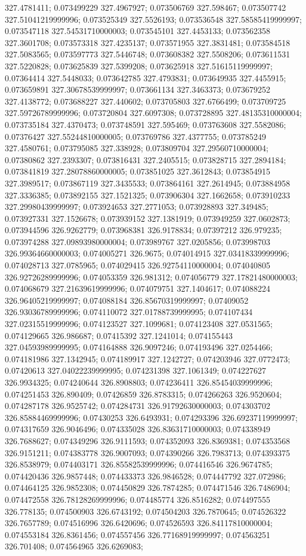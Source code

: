 327.4781411; 0.073499229 327.4967927; 0.073506769 327.598467; 0.073507742 327.51041219999996; 0.073525349 327.5526193; 0.073536548 327.58585419999997; 0.073547118 327.54531710000003; 0.073545101 327.4453133; 0.073562358 327.3601708; 0.073573318 327.4235137; 0.073571955 327.3831481; 0.073584518 327.5083565; 0.073597773 327.5446748; 0.073608382 327.5508206; 0.073611531 327.5220828; 0.073625839 327.5399208; 0.073625918 327.51615119999997; 0.07364414 327.5448033; 0.073642785 327.4793831; 0.073649935 327.4455915; 0.073659891 327.30678539999997; 0.073661134 327.3463373; 0.073679252 327.4138772; 0.073688227 327.440602; 0.073705803 327.6766499; 0.073709725 327.59726789999996; 0.073720804 327.6097308; 0.073728895 327.48135310000004; 0.073735184 327.4370473; 0.073748591 327.595469; 0.073763608 327.5582086; 0.07376427 327.55244810000005; 0.073769786 327.4377755; 0.073785249 327.4580761; 0.073795085 327.338928; 0.073809704 327.29560710000004; 0.07380862 327.2393307; 0.073816431 327.2405515; 0.073828715 327.2894184; 0.073841819 327.28078860000005; 0.073851025 327.3612843; 0.073854915 327.3989517; 0.073867119 327.3435533; 0.073864161 327.2614945; 0.073884958 327.3336385; 0.073892155 327.1521325; 0.073906304 327.1662658; 0.073910233 327.29980439999997; 0.073924653 327.2771053; 0.073928893 327.349485; 0.073927331 327.1526678; 0.073939152 327.1381919; 0.073949259 327.0602873; 0.073944596 326.9262779; 0.073968381 326.9178834; 0.07397212 326.979235; 0.073974288 327.09893980000004; 0.073989767 327.0205856; 0.073998703 326.99364660000003; 0.074005271 326.9675; 0.074014915 327.03418339999996; 0.074028713 327.0785965; 0.074029415 326.92754110000004; 0.074040805 326.92726289999996; 0.074053359 326.981312; 0.074056779 327.17821480000003; 0.074068679 327.21639619999996; 0.074079751 327.1404617; 0.074088224 326.96405219999997; 0.074088184 326.85670319999997; 0.07409052 326.93036789999996; 0.074110072 327.01788739999995; 0.074107434 327.02315519999996; 0.074123527 327.1099681; 0.074123408 327.0531565; 0.074129665 326.986687; 0.07415392 327.1241014; 0.074155443 327.04593989999995; 0.074164888 326.9097246; 0.074193496 327.0254466; 0.074181986 327.1342945; 0.074189917 327.1242727; 0.074203946 327.0772473; 0.07420613 327.04022239999995; 0.074231398 327.1061349; 0.074227627 326.9934325; 0.074240644 326.8908803; 0.074236411 326.85454039999996; 0.074251453 326.890409; 0.07426859 326.8783315; 0.074266263 326.9520604; 0.074287178 326.9525742; 0.074284731 326.91792630000003; 0.074303702 326.85884469999996; 0.07430253 326.6493931; 0.074293396 326.69237119999997; 0.074317659 326.9046496; 0.074335028 326.83631710000003; 0.074338949 326.7688627; 0.074349296 326.9111593; 0.074352093 326.8369381; 0.074353568 326.9151211; 0.074383778 326.9007093; 0.074390266 326.7983713; 0.074393375 326.8538979; 0.074403171 326.85582539999996; 0.074416546 326.9674785; 0.074420436 326.9857448; 0.074433373 326.9846528; 0.074447792 327.072986; 0.074464125 326.9852308; 0.074450829 326.7874285; 0.074471546 326.7486904; 0.074472558 326.78128269999996; 0.074485774 326.8516282; 0.074497555 326.778135; 0.074500903 326.6743192; 0.074504203 326.7870645; 0.074526322 326.7657789; 0.074516996 326.6420696; 0.074526593 326.84117810000004; 0.074553184 326.8361456; 0.074557456 326.77168919999997; 0.074563251 326.701408; 0.074564965 326.6269083; 